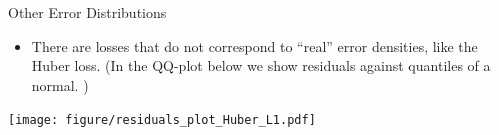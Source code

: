 \begin{vbframe}{Other Error Distributions}

\begin{itemize}
\item There are losses that do not correspond to \enquote{real} error densities, like the Huber loss. (In the QQ-plot below we show residuals against quantiles of a normal. )
\end{itemize}

\begin{center}
\texttt{[image: figure/residuals\_plot\_Huber\_L1.pdf]}
\end{center}




\end{vbframe}



